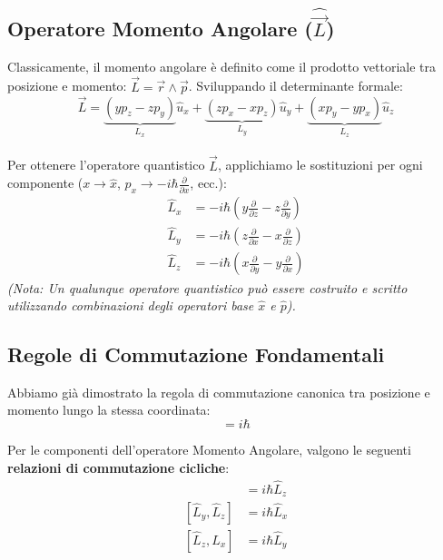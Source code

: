 \documentclass[11pt, a4paper]{article}
\begin{document}
\subsection{Operatore Momento Angolare ($\hat{\vec{L}}$)} %

Classicamente, il momento angolare è definito come il prodotto vettoriale tra posizione e momento: $\vec{L} = \vec{r} \wedge \vec{p}$. %
Sviluppando il determinante formale: %
\begin{equation*}
    \vec{L} = \underbrace{(y p_z - z p_y)}_{L_x}\hat{u}_x + \underbrace{(z p_x - x p_z)}_{L_y}\hat{u}_y + \underbrace{(x p_y - y p_x)}_{L_z}\hat{u}_z %
\end{equation*}

\noindent
Per ottenere l'operatore quantistico $\hat{\vec{L}}$, applichiamo le sostituzioni per ogni componente ($x \to \hat{x}$, $p_x \to -i\hbar \frac{\partial}{\partial x}$, ecc.): %
\begin{align*}
    \hat{L}_x &= -i\hbar \left( y \frac{\partial}{\partial z} - z \frac{\partial}{\partial y} \right) \\ %
    \hat{L}_y &= -i\hbar \left( z \frac{\partial}{\partial x} - x \frac{\partial}{\partial z} \right) \\ %
    \hat{L}_z &= -i\hbar \left( x \frac{\partial}{\partial y} - y \frac{\partial}{\partial x} \right) %
\end{align*}
\textit{(Nota: Un qualunque operatore quantistico può essere costruito e scritto utilizzando combinazioni degli operatori base $\hat{x}$ e $\hat{p}$).} %

\subsection{Regole di Commutazione Fondamentali} %

Abbiamo già dimostrato la regola di commutazione canonica tra posizione e momento lungo la stessa coordinata: %
\begin{equation*}
    [\hat{x}, \hat{p}_x] = i\hbar %
\end{equation*}

\noindent
Per le componenti dell'operatore Momento Angolare, valgono le seguenti \textbf{relazioni di commutazione cicliche}: %
\begin{align*}
    [\hat{L}_x, \hat{L}_y] &= i\hbar \hat{L}_z \\ %
    [\hat{L}_y, \hat{L}_z] &= i\hbar \hat{L}_x \\ %
    [\hat{L}_z, \hat{L}_x] &= i\hbar \hat{L}_y %
\end{align*}
\end{document}
